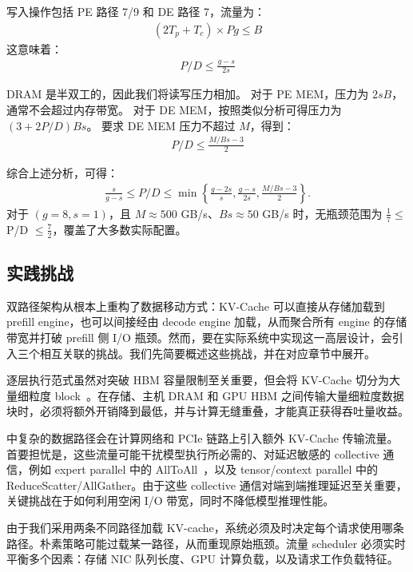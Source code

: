 写入操作包括 PE 路径 7/9 和 DE 路径 7，流量为：
\begin{align}
(2T_p + T_c) \times Pg \leq B
\end{align}
这意味着：
\begin{align}
P/D \leq \frac{g-s}{2s}
\end{align}

DRAM 是半双工的，因此我们将读写压力相加。
对于 PE MEM，压力为 $2sB$，通常不会超过内存带宽。
对于 DE MEM，按照类似分析可得压力为 $(3 + 2P/D) Bs$。
要求 DE MEM 压力不超过 $M$，得到：
\begin{align}
P/D \leq \frac{M/Bs - 3}{2}
\end{align}

 综合上述分析，可得：
\begin{align}
\frac{s}{g-s} \leq P/D \leq \min\left\{\frac{g-2s}{s}, \frac{g-s}{2s}, \frac{M/Bs - 3}{2}\right\}.
\end{align}
对于 $(g=8, s=1)$，且 $M \approx 500$ GB/s、$Bs \approx 50$ GB/s 时，无瓶颈范围为 $\frac{1}{7} \leq$ P/D $\leq \frac{7}{2}$，覆盖了大多数实际配置。


\subsection{实践挑战}
\label{sec:system}

双路径架构从根本上重构了数据移动方式：KV-Cache 可以直接从存储加载到 prefill engine，也可以间接经由 decode engine 加载，从而聚合所有 engine 的存储带宽并打破 prefill 侧 I/O 瓶颈。然而，要在实际系统中实现这一高层设计，会引入三个相互关联的挑战。我们先简要概述这些挑战，并在对应章节中展开。

逐层执行范式虽然对突破 HBM 容量限制至关重要，但会将 KV-Cache 切分为大量细粒度 block~\cite{ISCA24:Splitwise}。在存储、主机 DRAM 和 GPU HBM 之间传输大量细粒度数据块时，必须将额外开销降到最低，并与计算无缝重叠，才能真正获得吞吐量收益。

\sysname 中复杂的数据路径会在计算网络和 PCIe 链路上引入额外 KV-Cache 传输流量。首要担忧是，这些流量可能干扰模型执行所必需的、对延迟敏感的 collective 通信，例如 expert parallel 中的 AllToAll~\cite{DeepEP}，以及 tensor/context parallel 中的 ReduceScatter/AllGather。由于这些 collective 通信对端到端推理延迟至关重要，关键挑战在于如何利用空闲 I/O 带宽，同时不降低模型推理性能。

由于我们采用两条不同路径加载 KV-cache，系统必须及时决定每个请求使用哪条路径。朴素策略可能过载某一路径，从而重现原始瓶颈。流量 scheduler 必须实时平衡多个因素：存储 NIC 队列长度、GPU 计算负载，以及请求工作负载特征。


